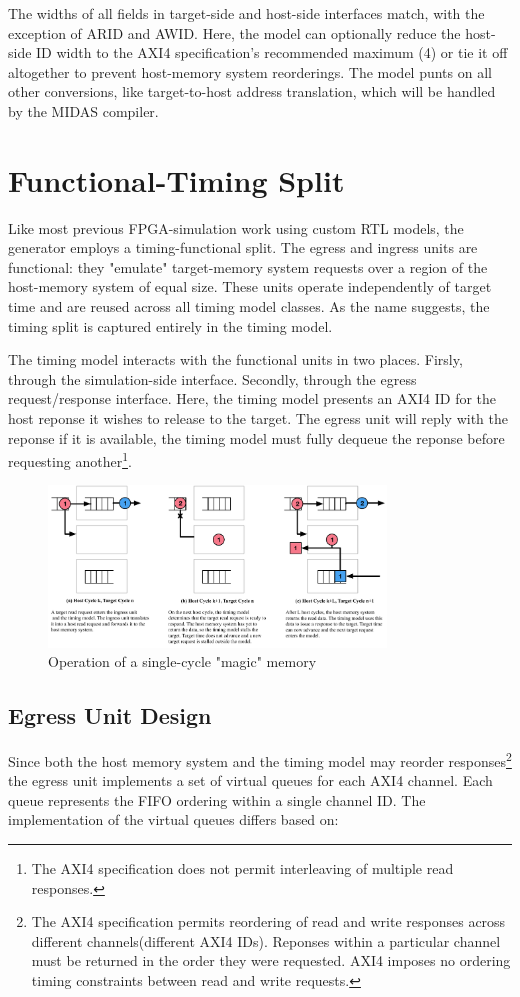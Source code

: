 The widths of all fields in target-side and host-side interfaces match, with
the exception of ARID and AWID. Here, the model can optionally reduce the
host-side ID width to the AXI4 specification's recommended maximum (4) or tie
it off altogether to prevent host-memory system reorderings. The model punts on
all other conversions, like target-to-host address translation, which will be
handled by the MIDAS compiler.

\section{Functional-Timing Split}

Like most previous FPGA-simulation work using custom RTL models, the generator
employs a timing-functional split. The egress and ingress units are functional:
they "emulate" target-memory system requests over a region of the host-memory
system of equal size. These units operate independently of target time and are
reused across all timing model classes. As the name suggests, the timing split
is captured entirely in the timing model.

The timing model interacts with the functional units in two places. Firsly,
through the simulation-side interface. Secondly, through the egress
request/response interface. Here, the timing model presents an AXI4 ID for the
host reponse it wishes to release to the target. The egress unit will reply
with the reponse if it is available, the timing model must fully dequeue the
reponse before requesting another\footnote{The AXI4 specification does not
permit interleaving of multiple read responses.}.

\begin{figure}
	\centering
	\includegraphics[width=0.8\textwidth]{figures/memory-model-operation.pdf}
	\caption{Operation of a single-cycle "magic" memory}
	\label{fig:model_operation}
\end{figure}

\subsection{Egress Unit Design}\label{egress} Since both the host memory
system and the timing model may reorder responses\footnote{The AXI4
specification permits reordering of read and write responses across different
channels(different AXI4 IDs). Reponses within a particular channel must be
returned in the order they were requested. AXI4 imposes no ordering timing
constraints between read and write requests.} the egress unit implements a set
of virtual queues for each AXI4 channel. Each queue represents the FIFO
ordering within a single channel ID. The implementation of the virtual queues
differs based on:

